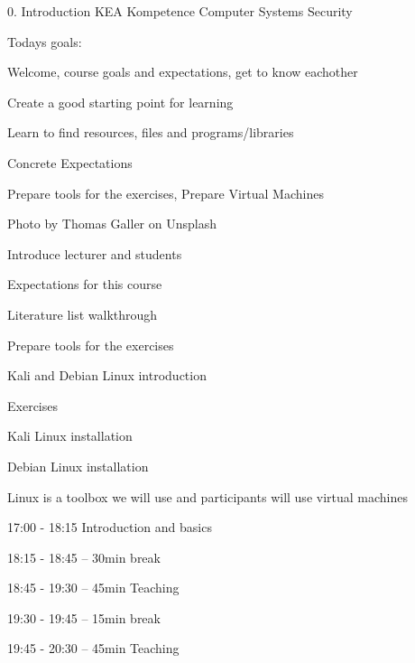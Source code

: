 \documentclass[Screen16to9,17pt]{foils}
\begin{document}
\mytitlepage
{0. Introduction}
{KEA Kompetence Computer Systems Security \the\year}

\hlkprofiluk




Todays goals:
\begin{list2}
\item Welcome, course goals and expectations, get to know eachother
\item Create a good starting point for learning
\item Learn to find resources, files and programs/libraries
\item Concrete Expectations
\item Prepare tools for the exercises, Prepare Virtual Machines
\end{list2}

  Photo by Thomas Galler on Unsplash



\begin{list2}
\item Introduce lecturer and students
\item Expectations for this course
\item Literature list walkthrough
\item Prepare tools for the exercises
\item Kali and Debian Linux introduction
\end{list2}

Exercises
\begin{list2}
\item Kali Linux installation
\item Debian Linux installation
\end{list2}
Linux is a toolbox we will use and participants will use virtual machines



\begin{list1}
\item 17:00 - 18:15
Introduction and basics
\item 18:15 - 18:45 -- 30min break
\item 18:45 - 19:30 -- 45min Teaching
\item 19:30 - 19:45 -- 15min break
\item 19:45 - 20:30 -- 45min Teaching
\end{list1}
\end{document}

